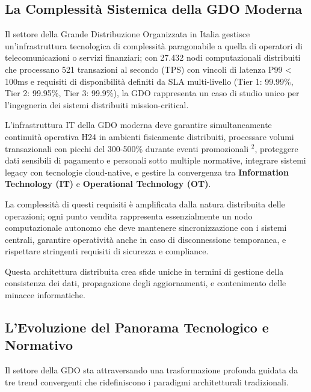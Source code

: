 \documentclass[12pt,a4paper,oneside]{book}
\numberwithin{figure}{chapter} %
\numberwithin{table}{chapter}  %
\begin{document}
\subsection{\texorpdfstring{\textbf{La Complessità Sistemica
della GDO
Moderna}}{1.1.1 La Complessità Sistemica della GDO Moderna}}\label{la-complessituxe0-sistemica-della-gdo-moderna}

Il settore della Grande Distribuzione Organizzata in Italia gestisce
un'infrastruttura tecnologica di complessità paragonabile a quella di
operatori di telecomunicazioni o servizi finanziari; con 27.432 nodi computazionali distribuiti che processano 521 transazioni al secondo (TPS) con vincoli di latenza P99 < 100ms e requisiti di disponibilità definiti da SLA multi-livello (Tier 1: 99.99\%, Tier 2: 99.95\%, Tier 3: 99.9\%), la GDO rappresenta un caso di studio unico per l'ingegneria dei sistemi distribuiti mission-critical.

L'infrastruttura IT della GDO moderna deve garantire simultaneamente
continuità operativa H24 in ambienti fisicamente distribuiti, processare
volumi transazionali con picchi del 300-500\% durante eventi
promozionali $^2$, proteggere dati sensibili di pagamento e personali sotto
multiple normative, integrare sistemi legacy con tecnologie
cloud-native, e gestire la convergenza tra \textbf{Information Technology (IT)} e
\textbf{Operational Technology (OT)}.

La complessità di questi requisiti è amplificata dalla natura
distribuita delle operazioni; ogni punto vendita rappresenta
essenzialmente un nodo computazionale autonomo che deve mantenere
sincronizzazione con i sistemi centrali, garantire operatività anche in
caso di disconnessione temporanea, e rispettare stringenti requisiti di
sicurezza e compliance.

Questa architettura distribuita crea sfide uniche in termini di gestione
della consistenza dei dati, propagazione degli aggiornamenti, e
contenimento delle minacce informatiche.

\subsection{\texorpdfstring{\textbf{L'Evoluzione del Panorama
Tecnologico e
Normativo}}{1.1.2 L'Evoluzione del Panorama Tecnologico e Normativo}}\label{levoluzione-del-panorama-tecnologico-e-normativo}

Il settore della GDO sta attraversando una trasformazione profonda
guidata da tre trend convergenti che ridefiniscono i paradigmi
architetturali tradizionali.
\end{document}
